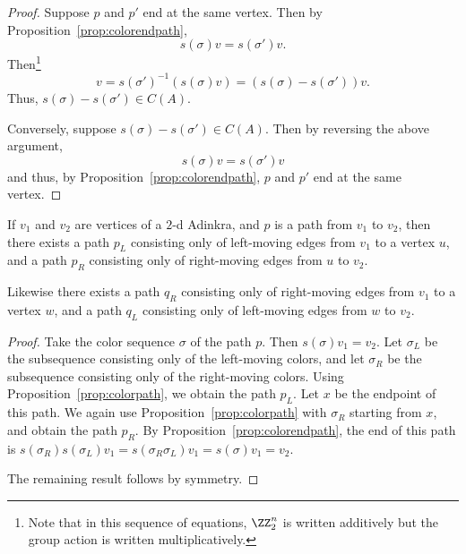 \begin{proof}
Suppose $p$ and $p'$ end at the same vertex.  Then by Proposition~\ref{prop:colorendpath},
\[s(\sigma)v=s(\sigma')v.\]
Then\footnote{Note that in this sequence of equations, $\ZZ_2^n$ is written additively but the group action is written multiplicatively.}
\[v=s(\sigma')^{-1}(s(\sigma)v)=(s(\sigma)-s(\sigma'))v.\]
Thus, $s(\sigma)-s(\sigma')\in C(A)$.

Conversely, suppose $s(\sigma)-s(\sigma')\in C(A)$.  Then by reversing the above argument,
\[s(\sigma)v=s(\sigma')v\]
and thus, by Proposition~\ref{prop:colorendpath}, $p$ and $p'$ end at the same vertex.
\end{proof}








\begin{prop}
\label{prop:reorderpath}
If $v_1$ and $v_2$ are vertices of a $2$-d Adinkra, and $p$ is a path from $v_1$ to $v_2$, then there exists a path $p_L$ consisting only of left-moving edges from $v_1$ to a vertex $u$, and a path $p_R$ consisting only of right-moving edges from $u$ to $v_2$.

Likewise there exists a path $q_R$ consisting only of right-moving edges from $v_1$ to a vertex $w$, and a path $q_L$ consisting only of left-moving edges from $w$ to $v_2$.
\end{prop}

\begin{proof}
Take the color sequence $\sigma$ of the path $p$.  Then $s(\sigma)v_1=v_2$.  Let $\sigma_L$ be the subsequence consisting only of the left-moving colors, and let $\sigma_R$ be the subsequence consisting only of the right-moving colors.  Using Proposition~\ref{prop:colorpath}, we obtain the path $p_L$.  Let $x$ be the endpoint of this path.  We again use Proposition~\ref{prop:colorpath} with $\sigma_R$ starting from $x$, and obtain the path $p_R$.  By Proposition~\ref{prop:colorendpath}, the end of this path is $s(\sigma_R)s(\sigma_L)v_1=s(\sigma_R\sigma_L)v_1=s(\sigma)v_1=v_2$.

The remaining result follows by symmetry.
\end{proof}




